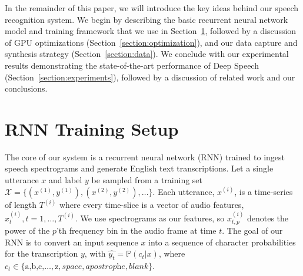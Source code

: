 \documentclass{article}
\begin{document}
In the remainder of this paper, we will introduce the key ideas behind our
speech recognition system.  We begin by describing the basic recurrent neural
network model and training framework that we use in
Section~\ref{section:model}, followed by  a discussion of GPU optimizations
(Section~\ref{section:optimization}), and our data capture and synthesis
strategy (Section~\ref{section:data}).  We conclude with our experimental
results demonstrating the state-of-the-art performance of Deep Speech
(Section~\ref{section:experiments}), followed by a discussion of related work
and our conclusions.

\section{RNN Training Setup}
\label{section:model}
The core of our system is a recurrent neural network (RNN) trained to ingest
speech spectrograms and generate English text transcriptions.  Let a single
utterance $x$ and label $y$ be sampled from a training set $\mathcal{X} =
\{(x^{(1)},y^{(1)}),(x^{(2)},y^{(2)}),\ldots\}$.  Each utterance, $x^{(i)}$, is
a time-series of length $T^{(i)}$ where every time-slice is a vector of audio
features, $x_t^{(i)}, t=1,\ldots,T^{(i)}$.  We use spectrograms as our
features, so $x^{(i)}_{t,p}$ denotes the power of the $p$'th frequency bin in
the audio frame at time $t$.  The goal of our RNN is to convert an input
sequence $x$ into a sequence of character probabilities for the transcription
$y$, with $\hat{y_t} = \mathbb{P}(c_t|x)$, where $c_t \in
\{\textrm{a,b,c,}\ldots,\textrm{z},
\textit{space},\textit{apostrophe},\textit{blank}\}$.
\end{document}

